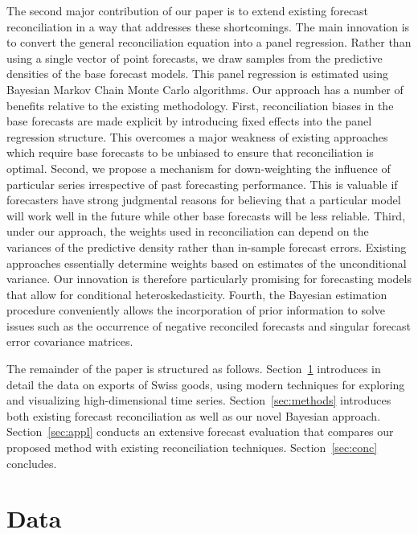 \documentclass[a4paper,fleqn,11pt]{article}
\begin{document}
The second major contribution of our paper is to extend existing forecast reconciliation in a way that addresses these shortcomings. The main innovation is to convert the general reconciliation equation into a panel regression. Rather than using a single vector of point forecasts, we draw samples from the predictive densities of the base forecast models. This panel regression is estimated using Bayesian Markov Chain Monte Carlo algorithms. Our approach has a number of benefits relative to the existing methodology. First, reconciliation biases in the base forecasts are made explicit by introducing fixed effects into the panel regression structure. This overcomes a major weakness of existing approaches which require base forecasts to be unbiased to ensure that reconciliation is optimal. Second, we propose a mechanism for down-weighting the influence of particular series irrespective of past forecasting performance. This is valuable if forecasters have strong judgmental reasons for believing that a particular model will work well in the future while other base forecasts will be less reliable. Third, under our approach, the weights used in reconciliation can depend on the variances of the predictive density rather than in-sample forecast errors. Existing approaches essentially determine weights based on estimates of the unconditional variance. Our innovation is therefore particularly promising for forecasting models that allow for conditional heteroskedasticity. Fourth, the Bayesian estimation procedure conveniently allows the incorporation of prior information to solve issues such as the occurrence of negative reconciled forecasts and singular forecast error covariance matrices.

The remainder of the paper is structured as follows. Section~\ref{sec:datadesc} introduces in detail the data on exports of Swiss goods, using modern techniques for exploring and visualizing high-dimensional time series. Section~\ref{sec:methods} introduces both existing forecast reconciliation as well as our novel Bayesian approach. Section~\ref{sec:appl} conducts an extensive forecast evaluation that compares our proposed method with existing reconciliation techniques. Section~\ref{sec:conc} concludes.

\section{Data}\label{sec:datadesc}
\end{document}
